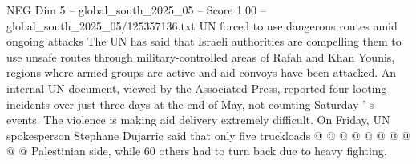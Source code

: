 \begin{textsample}{NEG Dim 5 – global\_south\_2025\_05 – Score 1.00 – global\_south\_2025\_05/125357136.txt}
UN forced to use dangerous routes amid ongoing attacks The UN has said that Israeli authorities are compelling them to use unsafe routes through military-controlled areas of Rafah and Khan Younis, regions where armed groups are active and aid convoys have been attacked.
An internal UN document, viewed by the Associated Press, reported four looting incidents over just three days at the end of May, not counting Saturday ' s events.
The violence is making aid delivery extremely difficult.
On Friday, UN spokesperson Stephane Dujarric said that only five truckloads @ @ @ @ @ @ @ @ @ @ Palestinian side, while 60 others had to turn back due to heavy fighting.

\end{textsample}
